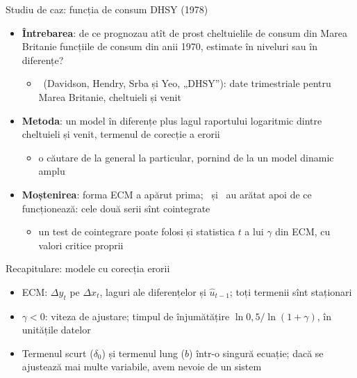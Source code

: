 \begin{frame}{Studiu de caz: funcția de consum DHSY (1978)}
\itemsize{\small}
\begin{itemize}
    \item \textbf{Întrebarea}: de ce prognozau atît de prost cheltuielile de consum din Marea Britanie funcțiile de consum din anii 1970, estimate în niveluri sau în diferențe?
    \begin{itemize}
        \item {}\ (Davidson, Hendry, Srba și Yeo, „DHSY”): date trimestriale pentru Marea Britanie, cheltuieli și venit
    \end{itemize}
    \item \textbf{Metoda}: un model în diferențe plus lagul raportului logaritmic dintre cheltuieli și venit, termenul de corecție a erorii
    \begin{itemize}
        \item o căutare de la general la particular, pornind de la un model dinamic amplu
    \end{itemize}
    \item \textbf{Moștenirea}: forma ECM a apărut prima; \ și \ au arătat apoi de ce funcționează: cele două serii sînt cointegrate
    \begin{itemize}
        \item un test de cointegrare poate folosi și statistica $t$ a lui $\gamma$ din ECM, cu valori critice proprii 
    \end{itemize}
\end{itemize}
\end{frame}

\begin{frame}{Recapitulare: modele cu corecția erorii}
\itemsize{\small}
\begin{itemize}
    \item ECM: $\Delta y_t$ pe $\Delta x_t$, laguri ale diferențelor și $\hat u_{t-1}$; toți termenii sînt staționari
    \item $\gamma < 0$: viteza de ajustare; timpul de înjumătățire $\ln 0{,}5/\ln(1 + \gamma)$, în unitățile datelor
    \item Termenul scurt ($\delta_0$) și termenul lung ($b$) într-o singură ecuație; dacă se ajustează mai multe variabile, avem nevoie de un sistem
\end{itemize}
\end{frame}


